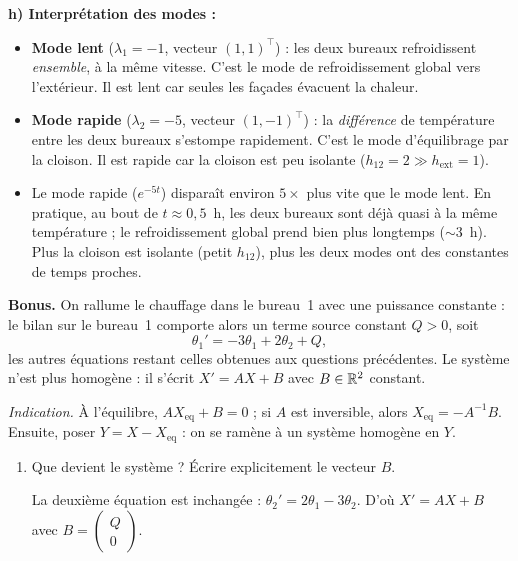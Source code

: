 \begin{enumerate}[itemsep=2em]
\begin{enumerate}[label=\alph*), itemsep=0.6em]
\begin{solution}
\textbf{h) Interprétation des modes :}
\begin{itemize}[nosep]
  \item \textbf{Mode lent} ($\lambda_1 = -1$, vecteur $(1,1)^\top$) : les deux bureaux refroidissent \emph{ensemble}, à la même vitesse. C'est le mode de refroidissement global vers l'extérieur. Il est lent car seules les façades évacuent la chaleur.
  \item \textbf{Mode rapide} ($\lambda_2 = -5$, vecteur $(1,-1)^\top$) : la \emph{différence} de température entre les deux bureaux s'estompe rapidement. C'est le mode d'équilibrage par la cloison. Il est rapide car la cloison est peu isolante ($h_{12} = 2 \gg h_{\mathrm{ext}} = 1$).
  \item Le mode rapide ($e^{-5t}$) disparaît environ $5\times$ plus vite que le mode lent. En pratique, au bout de $t \approx 0{,}5$~h, les deux bureaux sont déjà quasi à la même température ; le refroidissement global prend bien plus longtemps ($\sim 3$~h). Plus la cloison est isolante (petit $h_{12}$), plus les deux modes ont des constantes de temps proches.
\end{itemize}
\end{solution}
\end{enumerate}

\medskip
\noindent\textbf{Bonus.}
On rallume le chauffage dans le bureau~1 avec une puissance constante : le bilan sur le bureau~1 comporte alors un terme source constant $Q > 0$, soit
\[
  \theta_1' = -3\theta_1 + 2\theta_2 + Q,
\]
les autres équations restant celles obtenues aux questions précédentes.
Le système n'est plus homogène : il s'écrit $X' = AX + B$ avec $B \in \mathbb{R}^2$ constant.

\smallskip
\noindent\textit{Indication.}
À l'équilibre, $AX_{\mathrm{eq}} + B = 0$ ; si $A$ est inversible, alors $X_{\mathrm{eq}} = -A^{-1}B$.
Ensuite, poser $Y = X - X_{\mathrm{eq}}$ : on se ramène à un système homogène en $Y$.

\begin{enumerate}[label=\alph*), itemsep=0.6em]
  \item Que devient le système ? Écrire explicitement le vecteur $B$.

\begin{solution}
La deuxième équation est inchangée : $\theta_2' = 2\theta_1 - 3\theta_2$. D'où
$X' = AX + B$ avec $B = \begin{pmatrix} Q \\ 0 \end{pmatrix}$.
\end{solution}


\end{enumerate}
\end{enumerate}
